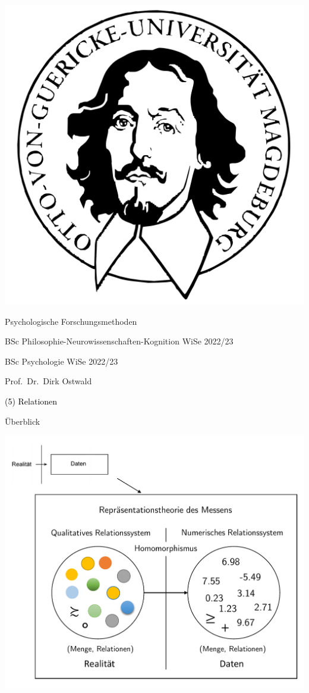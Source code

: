 \documentclass[
  8pt,
  ignorenonframetext,
]{beamer}
\author{}
\date{\vspace{-2.5em}}
\begin{document}
\begin{frame}[plain]{}
\protect\hypertarget{section}{}
\center

\begin{center}\includegraphics[width=0.2\linewidth]{5_Abbildungen/pfm_5_otto} \end{center}

\vspace{2mm}

\Large

Psychologische Forschungsmethoden \vspace{6mm}

\normalsize

BSc Philosophie-Neurowissenschaften-Kognition WiSe 2022/23

BSc Psychologie WiSe 2022/23

\large
\vspace{6mm}

Prof.~Dr.~Dirk Ostwald
\end{frame}

\begin{frame}[plain]{}
\protect\hypertarget{section-1}{}
\vfill
\center
\huge

\textcolor{black}{(5) Relationen} \vfill
\end{frame}

\begin{frame}{Überblick}
\protect\hypertarget{uxfcberblick}{}
\vfill

\begin{center}\includegraphics[width=0.8\linewidth]{5_Abbildungen/pfm_5_messtheorie} \end{center}
\end{frame}
\end{document}
